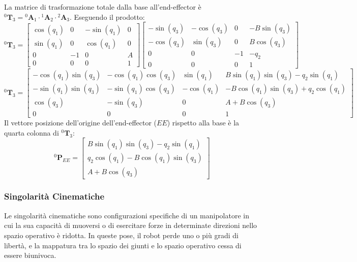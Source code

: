 ﻿\documentclass[11pt, a4paper]{article}
\begin{document}
La matrice di trasformazione totale dalla base all'end-effector è $^{0}\bm{T}_{3} = {^{0}\bm{A}_{1}} \cdot {^{1}\bm{A}_{2}} \cdot {^{2}\bm{A}_{3}}$. Eseguendo il prodotto:
\[
    ^{0}\bm{T}_{3} =
    \begin{bmatrix}
        \cos(q_1) & 0 & -\sin(q_1) & 0 \\
        \sin(q_1) & 0 & \cos(q_1) & 0 \\
        0 & -1 & 0 & A \\
        0 & 0 & 0 & 1
    \end{bmatrix}
    \begin{bmatrix}
        - \sin(q_3) & - \cos(q_3) & 0 & - B \sin(q_3) \\
        - \cos(q_3) & \sin(q_3) & 0 & B \cos(q_3) \\
        0 & 0 & -1 & -q_2 \\
        0 & 0 & 0 & 1
    \end{bmatrix}
\]
\[
    ^{0}\bm{T}_{3} =
    \begin{bmatrix}
        -\cos(q_1)\sin(q_3) & -\cos(q_1)\cos(q_3) & \sin(q_1) & B\sin(q_1)\sin(q_3) - q_2\sin(q_1) \\
        -\sin(q_1)\sin(q_3) & -\sin(q_1)\cos(q_3) & -\cos(q_1) & -B\cos(q_1)\sin(q_3) + q_2\cos(q_1) \\
        \cos(q_3) & -\sin(q_3) & 0 & A+B\cos(q_3) \\
        0 & 0 & 0 & 1
    \end{bmatrix}
\]
Il vettore posizione dell'origine dell'end-effector (\(EE\)) rispetto alla base è la quarta colonna di $^{0}\bm{T}_{3}$:
\[
    ^{0}\bm{P}_{EE} =
    \begin{bmatrix}
        B\sin(q_{1})\sin(q_{3}) - q_{2}\sin(q_{1}) \\
        q_{2}\cos(q_{1}) - B\cos(q_{1})\sin(q_{3}) \\
        A + B\cos(q_{3})
    \end{bmatrix}
\]
\newpage
\subsubsection{Singolarità Cinematiche}

Le singolarità cinematiche sono configurazioni specifiche di un manipolatore in cui la sua capacità di muoversi o di esercitare forze in determinate direzioni nello spazio operativo è ridotta. In queste pose, il robot perde uno o più gradi di libertà, e la mappatura tra lo spazio dei giunti e lo spazio operativo cessa di essere biunivoca.
\end{document}
